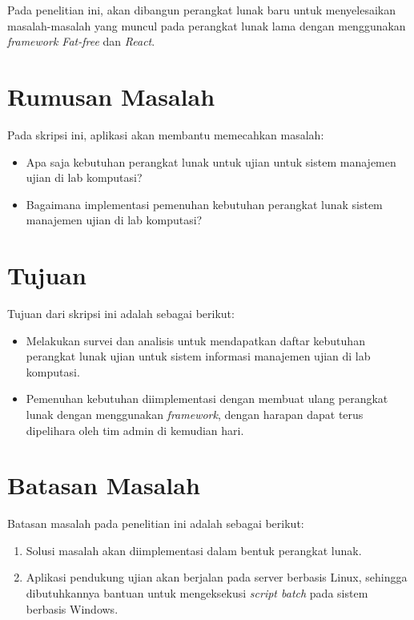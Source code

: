 Pada penelitian ini, akan dibangun perangkat lunak baru untuk menyelesaikan
masalah-masalah yang muncul pada perangkat lunak lama dengan menggunakan
\textit{framework Fat-free} dan \textit{React}.

\section{Rumusan Masalah}
\label{sec:rumusan}
Pada skripsi ini, aplikasi akan membantu memecahkan masalah:
\begin{itemize}
    \item Apa saja kebutuhan perangkat lunak untuk ujian untuk sistem manajemen
    ujian di lab komputasi?
    
    \item Bagaimana implementasi pemenuhan kebutuhan perangkat lunak sistem
    manajemen ujian di lab komputasi?
\end{itemize}

\section{Tujuan}
\label{sec:tujuan}
Tujuan dari skripsi ini adalah sebagai berikut:
\begin{itemize}
    \item Melakukan survei dan analisis untuk mendapatkan daftar kebutuhan
        perangkat lunak ujian untuk sistem informasi manajemen ujian di lab
        komputasi.
    \item Pemenuhan kebutuhan diimplementasi dengan membuat ulang perangkat
        lunak dengan menggunakan \textit{framework}, dengan harapan dapat terus
        dipelihara oleh tim admin di kemudian hari.
\end{itemize}

\section{Batasan Masalah}
\label{sec:batasan}
Batasan masalah pada penelitian ini adalah sebagai berikut:
\begin{enumerate}
    \item Solusi masalah akan diimplementasi dalam bentuk perangkat lunak.
  
    \item Aplikasi pendukung ujian akan berjalan pada server berbasis Linux,
        sehingga dibutuhkannya bantuan untuk mengeksekusi \textit{script batch}
        pada sistem berbasis Windows.
\end{enumerate}

